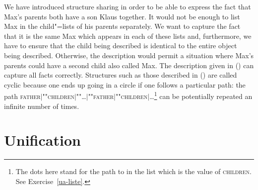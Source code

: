 We have introduced structure sharing in order to be able to express
the fact that Max's parents both have a son Klaus together. It would not be enough to list Max in
the child"=lists of his parents separately. We want to capture the fact that it is the same Max which
appears in each of these lists and, furthermore, we have to ensure that the child being described is
identical to the entire object being described. Otherwise, the description would permit a situation where Max's
parents could have a second child also called Max.  The description given in
() can capture all facts correctly.
\ea
\label{bsp-avm-zyklen}
 
\z
Structures such as those described in () are called cyclic because one ends up going in a circle if one follows a particular path: \eg the path 
\textsc{father$|$""children$|$""\ldots$|$""father$|$""children$|$\ldots}\footnote{%
	The dots here stand for the path to  in the list which is the value of \textsc{children}. See Exercise~\ref{ua-liste}.%
}
can be potentially repeated an infinite number of times.

\section{Unification}
\label{sec-unification}

